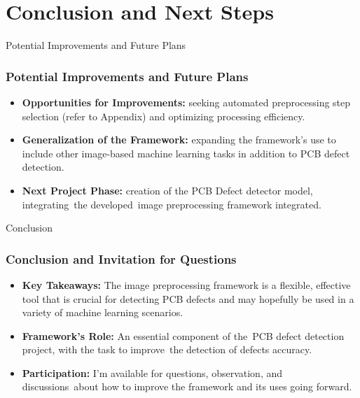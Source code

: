 \section{Conclusion and Next Steps}
\label{conclusion_section}


\begin{frame}{Potential Improvements and Future Plans}
    \frametitle{Potential Improvements and Future Plans}
    \begin{itemize}
        \item \textbf{Opportunities for Improvements:} seeking automated preprocessing step selection (refer to Appendix) and optimizing processing efficiency.
        \item \textbf{Generalization of the Framework:} expanding the framework's use to include other image-based machine learning tasks in addition to PCB defect detection.
        \item \textbf{Next Project Phase:} creation of the PCB Defect detector model, integrating the developed image preprocessing framework integrated.
    \end{itemize}
\end{frame}

\begin{frame}{Conclusion}
    \frametitle{Conclusion and Invitation for Questions}
    \begin{itemize}
        \item \textbf{Key Takeaways:} The image preprocessing framework is a flexible, effective tool that is crucial for detecting PCB defects and may hopefully be used in a variety of machine learning scenarios.
        \item \textbf{Framework's Role:} An essential component of the PCB defect detection project, with the task to improve the detection of defects accuracy.
        \item \textbf{Participation:} I'm available for questions, observation, and discussions about how to improve the framework and its uses going forward.
    \end{itemize}
\end{frame}
